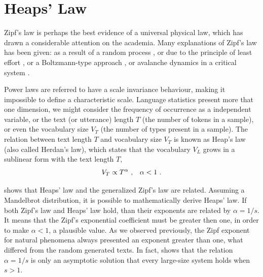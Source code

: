 %





\section{Heaps' Law}
Zipf's law is perhaps the best evidence of a universal physical law, which
has drawn a considerable attention on the academia. Many explanations
of Zipf's law has been given: as a result of a random process \citep{miller1957,li1992},
or due to the principle of least effort \citep{zipf1949, ramon2003}, or 
a Boltzmann-type approach \citep{during2008}, or avalanche dynamics in a
critical system \citep{bak1999}.

Power laws are referred to have a scale invariance behaviour, making it impossible
to define a characteristic scale. Language statistics present more that one
dimension, we might consider the frequency of occurrence as a independent variable,
or the text (or utterance) length $T$ (the number of tokens in a sample), 
or even the vocabulary size $V_T$ (the number of types present in a sample).
The relation between text length $T$ and vocabulary size $V_T$ is known as
Heap's law (also called Herdan's law), which states that the vocabulary
$V_L$ grows in a sublinear form with the text length $T$,
\begin{equation}
\label{eq:heaps}
V_T \propto T^\alpha \textmd{ , \ \ } \alpha < 1 \textmd{ .}
\end{equation}

\cite{vanLeijenhorst} shows that Heaps' law and the generalized Zipf's law are related.
Assuming a Mandelbrot distribution, it is possible to mathematically derive Heaps' law.
If both Zipf's law and Heaps' law hold, than their exponents are related by $\alpha = 1/s$.
It means that the Zipf's exponential coefficient must be greater then one, in order
to make $\alpha < 1$, a plausible value. As we observed previously, the Zipf exponent 
for natural phenomena always presented an exponent greater than one, what differed from 
the random generated texts. In fact, \cite{linyua2010} shows that the relation
$\alpha = 1/s$ is only an asymptotic solution that every large-size system holds
when $s > 1$. 

